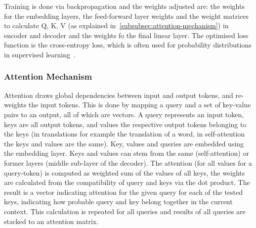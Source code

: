 Training is done via backpropagation and the weights adjusted are: the weights for the embedding layers, the feed-forward layer weights and the weight matrices to calculate Q, K, V (as explained in~\autoref{subsubsec:attention-mechanism}) in encoder and decoder and the weights fo the final linear layer.
The optimised loss function is the cross-entropy loss, which is often used for probability distributions in supervised learning~\autocite[Chapter~1.2.2]{Aggarwal2018}.

\subsubsection{Attention Mechanism}\label{subsubsec:attention-mechanism}
Attention draws global dependencies between input and output tokens, and re-weights the input tokens.%
 This is done by mapping a query and a set of key-value pairs to an output, all of which are vectors.
A query represents an input token, keys are all output tokens, and values the respective output tokens belonging to the keys (in translations for example the translation of a word, in self-attention the keys and values are the same). %
Key, values and queries are embedded using the embedding layer.
Keys and values can stem from the same (self-attention) or former layers (middle sub-layer of the decoder).
The attention (for all values for a query-token) is computed as weighted sum of the values of all keys, the weights are calculated from the compatibility of query and keys via the dot product.
The result is a vector indicating attention for the given query for each of the tested keys, indicating how probable query and key belong together in the current context.%
This calculation is repeated for all queries and results of all queries are stacked to an attention matrix.~\autocite{Vaswani2017}

